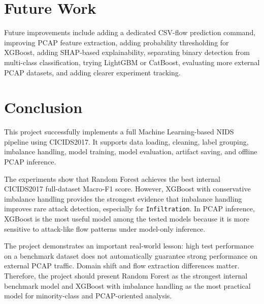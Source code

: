 \documentclass[12pt,a4paper]{article}
\begin{document}
\section{Future Work}

Future improvements include adding a dedicated CSV-flow prediction command, improving PCAP feature extraction, adding probability thresholding for XGBoost, adding SHAP-based explainability, separating binary detection from multi-class classification, trying LightGBM or CatBoost, evaluating more external PCAP datasets, and adding clearer experiment tracking.

\section{Conclusion}

This project successfully implements a full Machine Learning-based NIDS pipeline using CICIDS2017. It supports data loading, cleaning, label grouping, imbalance handling, model training, model evaluation, artifact saving, and offline PCAP inference.

The experiments show that Random Forest achieves the best internal CICIDS2017 full-dataset Macro-F1 score. However, XGBoost with conservative imbalance handling provides the strongest evidence that imbalance handling improves rare attack detection, especially for \texttt{Infiltration}. In PCAP inference, XGBoost is the most useful model among the tested models because it is more sensitive to attack-like flow patterns under model-only inference.

The project demonstrates an important real-world lesson: high test performance on a benchmark dataset does not automatically guarantee strong performance on external PCAP traffic. Domain shift and flow extraction differences matter. Therefore, the project should present Random Forest as the strongest internal benchmark model and XGBoost with imbalance handling as the most practical model for minority-class and PCAP-oriented analysis.
\end{document}
